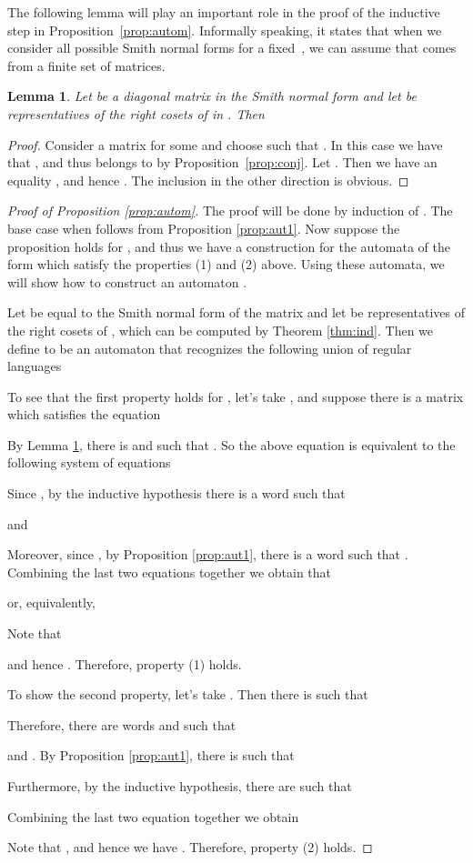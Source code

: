 \documentclass[fontsize=11pt,DIV=13,paper=letter]{scrartcl}
\newtheorem{lemma}[theorem]{Lemma}
\theoremstyle{definition}
\begin{document}
The following lemma will play an important role in the proof of the inductive step in Proposition~\ref{prop:autom}. Informally speaking, it states that when we consider all possible Smith normal forms  for a fixed~, we can assume that  comes from a finite set of matrices.

\begin{lemma} \label{lem:fin}
Let  be a diagonal matrix in the Smith normal form and let  be representatives of the right cosets of  in . Then

\end{lemma}

\begin{proof}
Consider a matrix  for some  and choose  such that . In this case we have that , and thus  belongs to  by Proposition~\ref{prop:conj}. Let . Then we have an equality , and hence . The inclusion in the other direction is obvious.

\end{proof}

\begin{proof}[Proof of Proposition \ref{prop:autom}]
The proof will be done by induction of . The base case when  follows from Proposition \ref{prop:aut1}. Now suppose the proposition holds for , and thus we have a construction for the automata of the form  which satisfy the properties (1) and (2) above. Using these automata, we will show how to construct an automaton .

Let  be equal to the Smith normal form of the matrix  and let  be representatives of the right cosets of , which can be computed by Theorem \ref{thm:ind}.
Then we define  to be an automaton that recognizes the following union of regular languages


To see that the first property holds for , let's take , and suppose there is a matrix  which satisfies the equation

By Lemma \ref{lem:fin}, there is  and  such that . So the above equation is equivalent to the following system of equations

Since , by the inductive hypothesis there is a word  such that

and

Moreover, since , by Proposition \ref{prop:aut1}, there is a word  such that . Combining the last two equations together we obtain that

or, equivalently,

Note that

and hence . Therefore, property (1) holds.

To show the second property, let's take . Then there is  such that

Therefore, there are words  and  such that

and . By Proposition \ref{prop:aut1}, there is  such that

Furthermore, by the inductive hypothesis, there are  such that

Combining the last two equation together we obtain

Note that , and hence we have .  Therefore, property (2) holds.

\end{proof}
\end{document}
